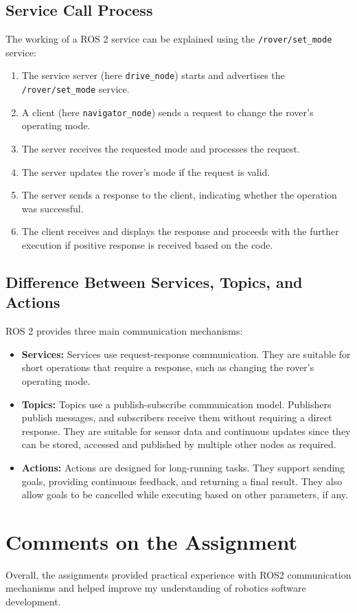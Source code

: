 \documentclass[12pt,a4paper]{article}
\begin{document}
\subsection{Service Call Process}
The working of a ROS 2 service can be explained using the \texttt{/rover/set\_mode} service:
\begin{enumerate}
    \item The service server (here \texttt{drive\_node}) starts and advertises the \texttt{/rover/set\_mode} service.
    \item A client (here \texttt{navigator\_node}) sends a request to change the rover's operating mode.
    \item The server receives the requested mode and processes the request.
    \item The server updates the rover's mode if the request is valid.
    \item The server sends a response to the client, indicating whether the operation was successful.
    \item The client receives and displays the response and proceeds with the further execution if positive response is received based on the code.
\end{enumerate}

\subsection{Difference Between Services, Topics, and Actions}
ROS 2 provides three main communication mechanisms:
\begin{itemize}
    \item \textbf{Services:} Services use request-response communication. They are suitable for short operations that require a response, such as changing the rover's operating mode.
    \item \textbf{Topics:} Topics use a publish-subscribe communication model. Publishers publish messages, and subscribers receive them without requiring a direct response. They are suitable for sensor data and continuous updates since they can be stored, accessed and published by multiple other nodes as required.
    \item \textbf{Actions:} Actions are designed for long-running tasks. They support sending goals, providing continuous feedback, and returning a final result. They also allow goals to be cancelled while executing based on other parameters, if any.
\end{itemize}

\section{Comments on the Assignment}
Overall, the assignments provided practical experience with ROS2 communication mechanisms and helped improve my understanding of robotics software development.
\end{document}
